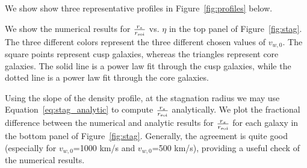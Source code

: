 \documentclass[usenatbib,fleqn]{mn2e}
\newcommand{\soi}{\rm soi}
\newcommand{\rsoi}{r_{\soi}}
\newcommand{\vwO}{v_{w,0}}
\newcommand{\x}{\frac{r_s}{\rsoi}}
\begin{document}
We show show three representative profiles in Figure~\ref{fig:profiles} below. 

We show the numerical results for $\x$ vs. $\eta$ in the top panel of Figure~\ref{fig:stag}.  The three different colors represent the three different chosen values of $\vwO$. The square points represent cusp galaxies, whereas the triangles represent core galaxies.  The solid line is a power law fit through the cusp galaxies, while the dotted line is a power law fit through the core galaxies. 

Using the slope of the density profile, at the stagnation radius we may use Equation~\ref{eq:stag_analytic} to compute $\x$ analytically. We plot the fractional difference between the numerical and analytic results for $\x$ for each galaxy in the bottom panel of Figure~\ref{fig:stag}.  Generally, the agreement is quite good (especially for $\vwO$=1000 km/s and $\vwO$=500 km/s), providing a useful check of the numerical results. 

\end{document}
